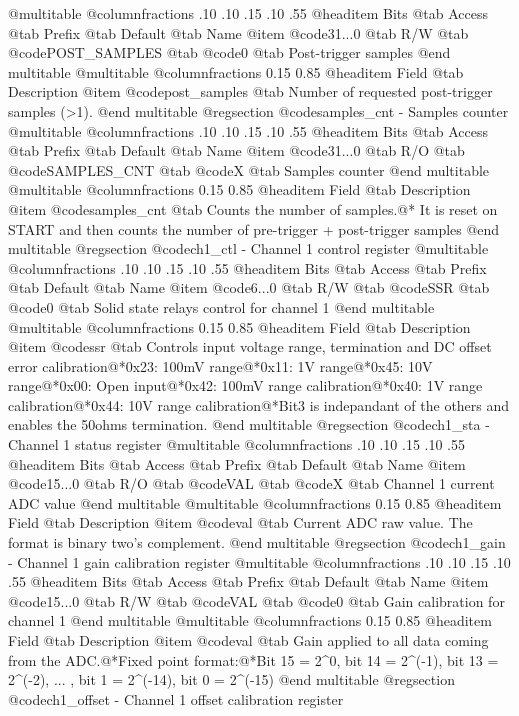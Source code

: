 @multitable @columnfractions .10 .10 .15 .10 .55
@headitem Bits @tab Access @tab Prefix @tab Default @tab Name
@item @code{31...0}
@tab R/W @tab
@code{POST_SAMPLES}
@tab @code{0} @tab 
Post-trigger samples
@end multitable
@multitable @columnfractions 0.15 0.85
@headitem Field @tab Description
@item @code{post_samples} @tab Number of requested post-trigger samples (>1).
@end multitable
@regsection @code{samples_cnt} - Samples counter
@multitable @columnfractions .10 .10 .15 .10 .55
@headitem Bits @tab Access @tab Prefix @tab Default @tab Name
@item @code{31...0}
@tab R/O @tab
@code{SAMPLES_CNT}
@tab @code{X} @tab 
Samples counter
@end multitable
@multitable @columnfractions 0.15 0.85
@headitem Field @tab Description
@item @code{samples_cnt} @tab Counts the number of samples.@* It is reset on START and then counts the number of pre-trigger + post-trigger samples
@end multitable
@regsection @code{ch1_ctl} - Channel 1 control register
@multitable @columnfractions .10 .10 .15 .10 .55
@headitem Bits @tab Access @tab Prefix @tab Default @tab Name
@item @code{6...0}
@tab R/W @tab
@code{SSR}
@tab @code{0} @tab 
Solid state relays control for channel 1
@end multitable
@multitable @columnfractions 0.15 0.85
@headitem Field @tab Description
@item @code{ssr} @tab Controls input voltage range, termination and DC offset error calibration@*0x23: 100mV range@*0x11: 1V range@*0x45: 10V range@*0x00: Open input@*0x42: 100mV range calibration@*0x40: 1V range calibration@*0x44: 10V range calibration@*Bit3 is indepandant of the others and enables the 50ohms termination.
@end multitable
@regsection @code{ch1_sta} - Channel 1 status register
@multitable @columnfractions .10 .10 .15 .10 .55
@headitem Bits @tab Access @tab Prefix @tab Default @tab Name
@item @code{15...0}
@tab R/O @tab
@code{VAL}
@tab @code{X} @tab 
Channel 1 current ADC value
@end multitable
@multitable @columnfractions 0.15 0.85
@headitem Field @tab Description
@item @code{val} @tab Current ADC raw value. The format is binary two's complement.
@end multitable
@regsection @code{ch1_gain} - Channel 1 gain calibration register
@multitable @columnfractions .10 .10 .15 .10 .55
@headitem Bits @tab Access @tab Prefix @tab Default @tab Name
@item @code{15...0}
@tab R/W @tab
@code{VAL}
@tab @code{0} @tab 
Gain calibration for channel 1
@end multitable
@multitable @columnfractions 0.15 0.85
@headitem Field @tab Description
@item @code{val} @tab Gain applied to all data coming from the ADC.@*Fixed point format:@*Bit 15 = 2^0, bit 14 = 2^(-1), bit 13 = 2^(-2), ... , bit 1 = 2^(-14), bit 0 = 2^(-15)
@end multitable
@regsection @code{ch1_offset} - Channel 1 offset calibration register
